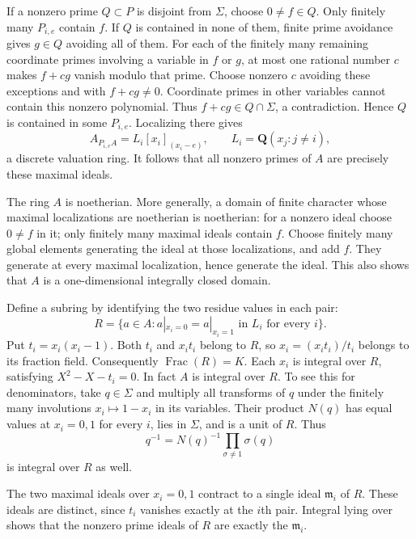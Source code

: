 \documentclass[11pt]{article}
\theoremstyle{definition}\newtheorem{definition}[theorem]{Definition}
\theoremstyle{remark}\newtheorem{remark}[theorem]{Remark}
\begin{document}
If a nonzero prime $Q\subset P$ is disjoint from $\Sigma$, choose $0\ne f\in Q$. Only finitely many $P_{i,e}$ contain $f$. If $Q$ is contained in none of them, finite prime avoidance gives $g\in Q$ avoiding all of them. For each of the finitely many remaining coordinate primes involving a variable in $f$ or $g$, at most one rational number $c$ makes $f+cg$ vanish modulo that prime. Choose nonzero $c$ avoiding these exceptions and with $f+cg\ne0$. Coordinate primes in other variables cannot contain this nonzero polynomial. Thus $f+cg\in Q\cap\Sigma$, a contradiction. Hence $Q$ is contained in some $P_{i,e}$. Localizing there gives
\[
 A_{P_{i,e}A}=L_i[x_i]_{(x_i-e)},\qquad
 L_i=\mathbf Q(x_j:j\ne i),
\]
a discrete valuation ring. It follows that all nonzero primes of $A$ are precisely these maximal ideals.

The ring $A$ is noetherian. More generally, a domain of finite character whose maximal localizations are noetherian is noetherian: for a nonzero ideal choose $0\ne f$ in it; only finitely many maximal ideals contain $f$. Choose finitely many global elements generating the ideal at those localizations, and add $f$. They generate at every maximal localization, hence generate the ideal. This also shows that $A$ is a one-dimensional integrally closed domain.

Define a subring by identifying the two residue values in each pair:
\begin{equation}\label{eq:ring}
 R=\{a\in A:a|_{x_i=0}=a|_{x_i=1}\text{ in }L_i\text{ for every }i\}.
\end{equation}
Put $t_i=x_i(x_i-1)$. Both $t_i$ and $x_it_i$ belong to $R$, so $x_i=(x_it_i)/t_i$ belongs to its fraction field. Consequently $\operatorname{Frac}(R)=K$. Each $x_i$ is integral over $R$, satisfying $X^2-X-t_i=0$. In fact $A$ is integral over $R$. To see this for denominators, take $q\in\Sigma$ and multiply all transforms of $q$ under the finitely many involutions $x_i\mapsto1-x_i$ in its variables. Their product $N(q)$ has equal values at $x_i=0,1$ for every $i$, lies in $\Sigma$, and is a unit of $R$. Thus
\[
 q^{-1}=N(q)^{-1}\prod_{\sigma\ne1}\sigma(q)
\]
is integral over $R$ as well.

The two maximal ideals over $x_i=0,1$ contract to a single ideal $\mathfrak m_i$ of $R$. These ideals are distinct, since $t_i$ vanishes exactly at the $i$th pair. Integral lying over shows that the nonzero prime ideals of $R$ are exactly the $\mathfrak m_i$.
\end{document}
